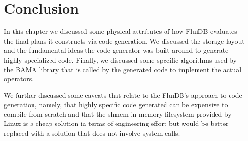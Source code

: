 \section{Conclusion}

In this chapter we discussed some physical attributes of how FluiDB
evaluates the final plans it constructs via code generation. We
discussed the storage layout and the fundamental ideas the code
generator was built around to generate highly specialized
code. Finally, we discussed some specific algorithms used by the BAMA
library that is called by the generated code to implement the actual
operators.

We further discussed some caveats that relate to the FluiDB's
approach to code generation, namely, that highly specific code
generated can be expensive to compile from scratch and that the shmem
in-memory filesystem provided by Linux is a cheap solution in terms of
engineering effort but would be better replaced with a solution that
does not involve system calls.
